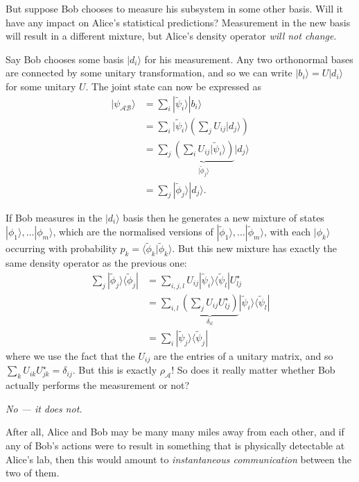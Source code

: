 \documentclass[fleqn,a4paper]{article}
\renewcommand{\footnote}[1]{\sidenotetext[{\color{white}0}\!\!]{\footnotesize #1}}
\theoremstyle{definition}
\theoremstyle{definition}
\theoremstyle{definition}
\theoremstyle{definition}
\theoremstyle{remark}
\begin{document}
But suppose Bob chooses to measure his subsystem in some other basis.
Will it have any impact on Alice's statistical predictions?
Measurement in the new basis will result in a different mixture, but Alice's density operator \emph{will not change}.

Say Bob chooses some basis \(|d_i\rangle\) for his measurement.
Any two orthonormal bases are connected by some unitary transformation, and so we can write \(|b_i\rangle=U|d_i\rangle\) for some\footnote{In terms of components, \(|b_i\rangle=\sum_j U_{ij}|d_j\rangle\)} unitary \(U\).
The joint state can now be expressed as
\[
  \begin{aligned}
    |\psi_{\mathcal{AB}}\rangle
    &= \sum_{i} |\widetilde\psi_i\rangle|b_i\rangle
  \\&= \sum_{i} |\widetilde\psi_i\rangle \left( \sum_j U_{ij}|d_j\rangle \right)
  \\&= \sum_j \underbrace{\left( \sum_i U_{ij}|\widetilde\psi_i\rangle \right)}_{|\widetilde\phi_j\rangle}|d_j\rangle
  \\&= \sum_j|\widetilde\phi_j\rangle|d_j\rangle.
  \end{aligned}
\]

If Bob measures in the \(|d_i\rangle\) basis then he generates a new mixture of states \(|\phi_1\rangle,\ldots|\phi_m\rangle\), which are the normalised versions of \(|\widetilde\phi_1\rangle,\ldots|\widetilde\phi_m\rangle\), with each \(|\phi_k\rangle\) occurring with probability \(p_k=\langle\widetilde\phi_k|\widetilde\phi_k\rangle\).
But this new mixture has exactly the same density operator as the previous one:
\[
  \begin{aligned}
    \sum_j|\widetilde\phi_j\rangle\langle\widetilde\phi_j|
    &= \sum_{i,j,l} U_{ij}|\widetilde\psi_i\rangle\langle\widetilde\psi_l|U^\star_{lj}
  \\&= \sum_{i,l} \underbrace{\left(\sum_j U_{ij}U^\star_{lj}\right)}_{\delta_{il}}|\widetilde\psi_i\rangle\langle\widetilde\psi_l|
  \\&= \sum_i|\widetilde\psi_j\rangle\langle\widetilde\psi_j|
  \end{aligned}
\]
where we use the fact that the \(U_{ij}\) are the entries of a unitary matrix, and so \(\sum_k U_{ik}U^\star_{jk}=\delta_{ij}\).
But this is exactly \(\rho_{\mathcal{A}}\)!
So does it really matter whether Bob actually performs the measurement or not?

\emph{No --- it does not.}

After all, Alice and Bob may be many many miles away from each other, and if any of Bob's actions were to result in something that is physically detectable at Alice's lab, then this would amount to \emph{instantaneous communication} between the two of them.
\end{document}

